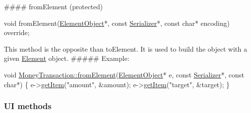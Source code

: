 \#\#\#\# from\+Element (protected) 
\begin{DoxyCode}
\textcolor{keywordtype}{void} fromElement(\mbox{\hyperlink{classElementObject}{ElementObject}}*, \textcolor{keyword}{const} \mbox{\hyperlink{classSerializer}{Serializer}}*, \textcolor{keyword}{const} \textcolor{keywordtype}{char}* encoding) \textcolor{keyword}{override};
\end{DoxyCode}
 This method is the opposite than to\+Element. It is used to build the object with a given \mbox{\hyperlink{classElement}{Element}} object. \#\#\#\#\# Example\+: 
\begin{DoxyCode}
\textcolor{keywordtype}{void} \mbox{\hyperlink{classMoneyTransaction_a6f4672dba3a75e2782d15366d9ed7a1e}{MoneyTransaction::fromElement}}(\mbox{\hyperlink{classElementObject}{ElementObject}}* e, \textcolor{keyword}{const} 
      \mbox{\hyperlink{classSerializer}{Serializer}}*, \textcolor{keyword}{const} \textcolor{keywordtype}{char}*) \{
    e->\mbox{\hyperlink{classElementObject_a7b3a1ef505e63d87ad39309c5ae1b5b3}{getItem}}(\textcolor{stringliteral}{"amount"}, \&amount);
    e->\mbox{\hyperlink{classElementObject_a7b3a1ef505e63d87ad39309c5ae1b5b3}{getItem}}(\textcolor{stringliteral}{"target"}, \&target);
\}
\end{DoxyCode}
 \subsubsection*{UI methods}

